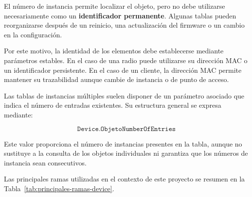 El número de instancia permite localizar el objeto, pero no debe
utilizarse necesariamente como un
\textbf{identificador permanente}. Algunas tablas pueden reorganizarse
después de un reinicio, una actualización del firmware o un cambio en la
configuración.

Por este motivo, la identidad de los elementos debe establecerse mediante
parámetros estables. En el caso de una radio puede utilizarse su dirección
MAC o un identificador persistente. En el caso de un cliente, la
dirección MAC permite mantener su trazabilidad aunque cambie de instancia
o de punto de acceso.

Las tablas de instancias múltiples suelen disponer de un parámetro
asociado que indica el número de entradas existentes. Su estructura
general se expresa mediante:

\[
    \texttt{Device.ObjetoNumberOfEntries}
\]

Este valor proporciona el número de instancias presentes en la tabla,
aunque no sustituye a la consulta de los objetos individuales ni
garantiza que los números de instancia sean consecutivos.

Las principales ramas utilizadas en el contexto de este proyecto se
resumen en la Tabla~\ref{tab:principales-ramas-device}.


